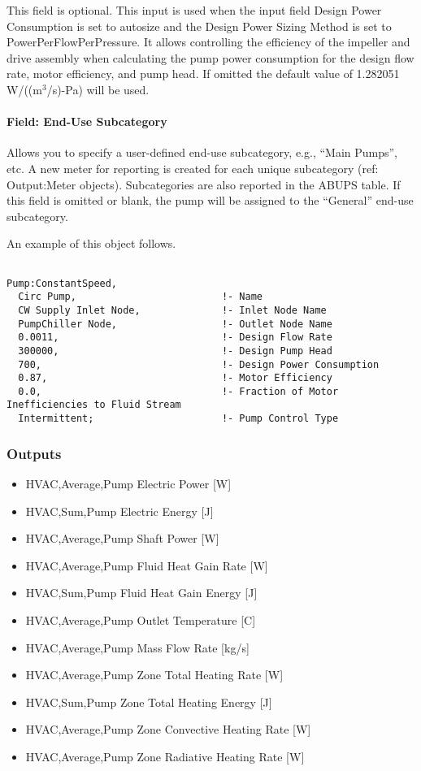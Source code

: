 This field is optional. This input is used when the input field Design Power Consumption is set to autosize and the Design Power Sizing Method is set to PowerPerFlowPerPressure. It allows controlling the efficiency of the impeller and drive assembly when calculating the pump power consumption for the design flow rate, motor efficiency, and pump head. If omitted the default value of 1.282051 W/((m\(^{3}\)/s)-Pa) will be used.

\paragraph{Field: End-Use Subcategory}\label{field-end-use-subcategory-2-000}

Allows you to specify a user-defined end-use subcategory, e.g., ``Main Pumps'', etc. A new meter for reporting is created for each unique subcategory (ref: Output:Meter objects). Subcategories are also reported in the ABUPS table. If this field is omitted or blank, the pump will be assigned to the ``General'' end-use subcategory.

An example of this object follows.

\begin{lstlisting}

Pump:ConstantSpeed,
  Circ Pump,                         !- Name
  CW Supply Inlet Node,              !- Inlet Node Name
  PumpChiller Node,                  !- Outlet Node Name
  0.0011,                            !- Design Flow Rate
  300000,                            !- Design Pump Head
  700,                               !- Design Power Consumption
  0.87,                              !- Motor Efficiency
  0.0,                               !- Fraction of Motor Inefficiencies to Fluid Stream
  Intermittent;                      !- Pump Control Type
\end{lstlisting}

\subsubsection{Outputs}\label{outputs-1-020}

\begin{itemize}
\item
  HVAC,Average,Pump Electric Power {[}W{]}
\item
  HVAC,Sum,Pump Electric Energy {[}J{]}
\item
  HVAC,Average,Pump Shaft Power {[}W{]}
\item
  HVAC,Average,Pump Fluid Heat Gain Rate {[}W{]}
\item
  HVAC,Sum,Pump Fluid Heat Gain Energy {[}J{]}
\item
  HVAC,Average,Pump Outlet Temperature {[}C{]}
\item
  HVAC,Average,Pump Mass Flow Rate {[}kg/s{]}
\item
  HVAC,Average,Pump Zone Total Heating Rate {[}W{]}
\item
  HVAC,Sum,Pump Zone Total Heating Energy {[}J{]}
\item
  HVAC,Average,Pump Zone Convective Heating Rate {[}W{]}
\item
  HVAC,Average,Pump Zone Radiative Heating Rate {[}W{]}
\end{itemize}

